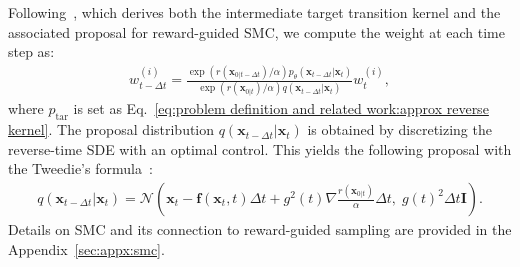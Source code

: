 Following~\cite{uehara2025inference, kim2025DAS, wu2023tds}, which derives both the intermediate target transition kernel and the associated proposal for reward-guided SMC, we compute the weight at each time step as:
\begin{align}
    \label{eq:problem definition:SMC weight}
    w_{t-\Delta t}^{(i)}= \frac{\exp (r(\mathbf{x}_{0|t-\Delta t})/\alpha)p_\theta(\mathbf{x}_{t-\Delta t}|\mathbf{x}_{t})}{\exp (r(\mathbf{x}_{0|t})/\alpha)q(\mathbf{x}_{t-\Delta t}|\mathbf{x}_{t})}w_t^{(i)},
\end{align}
where $p_\text{tar}$ is set as Eq.~\ref{eq:problem definition and related work:approx reverse kernel}.
The proposal distribution $q(\mathbf{x}_{t-\Delta t}|\mathbf{x}_{t})$ is obtained by discretizing the reverse-time SDE with an optimal control. This yields the following proposal with the Tweedie's formula~\cite{efron2011tweedie}:
\begin{align}
    \label{eq:problem definition and related work:SMC proposal}
    q(\mathbf{x}_{t-\Delta t}|\mathbf{x}_{t})=\mathcal{N}(\mathbf{x}_t-\mathbf{f}(\mathbf{x}_t,t)\Delta t+g^2(t)\nabla \frac{r(\mathbf{x}_{0|t})}{\alpha}\Delta t,\;g(t)^2\Delta t \mathbf{I}).
\end{align}
Details on SMC and its connection to reward-guided sampling are provided in the Appendix~\ref{sec:appx:smc}.

